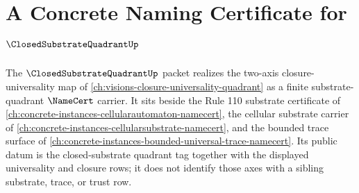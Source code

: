 \chapter{A Concrete Naming Certificate for $\ClosedSubstrateQuadrantUp$}
\label{ch:concrete-instances-closed-substrate-quadrant-namecert}

The $\ClosedSubstrateQuadrantUp$ packet realizes the two-axis closure-universality map of \autoref{ch:visions-closure-universality-quadrant} as a finite substrate-quadrant $\NameCert$ carrier. It sits beside the Rule 110 substrate certificate of \autoref{ch:concrete-instances-cellularautomaton-namecert}, the cellular substrate carrier of \autoref{ch:concrete-instances-cellularsubstrate-namecert}, and the bounded trace surface of \autoref{ch:concrete-instances-bounded-universal-trace-namecert}. Its public datum is the closed-substrate quadrant tag together with the displayed universality and closure rows; it does not identify those axes with a sibling substrate, trace, or trust row.



